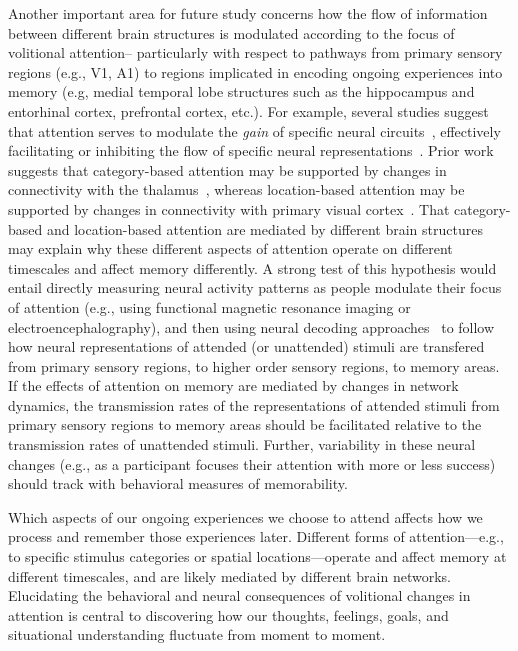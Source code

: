 \documentclass[english]{article}
\begin{document}
Another important area for future study concerns how the flow of information
between different brain structures is modulated according to the focus of
volitional attention-- particularly with respect to pathways from primary
sensory regions (e.g., V1, A1) to regions implicated in encoding ongoing
experiences into memory (e.g, medial temporal lobe structures such as the
hippocampus and entorhinal cortex, prefrontal cortex, etc.). For example,
several studies suggest that attention serves to modulate the \textit{gain} of
specific neural circuits~\citep{TreuTruj99, ChanEtal02, EldaEtal13,
SaliThie00}, effectively facilitating or inhibiting the flow of specific neural
representations~\citep{VartEtal07, LaRoEtal14}. Prior work suggests that
category-based attention may be supported by changes in connectivity with the
thalamus~\citep{Schn11}, whereas location-based attention may be supported by
changes in connectivity with primary visual cortex~\citep{NoudEtal10}. That
category-based and location-based attention are mediated by different brain
structures may explain why these different aspects of attention operate on
different timescales and affect memory differently. A strong test of this
hypothesis would entail directly measuring neural activity patterns as people
modulate their focus of attention (e.g., using functional magnetic resonance
imaging or electroencephalography), and then using neural decoding
approaches~\citep[e.g.,][]{HaxbEtal01, NormEtal06b, MannEtal18, OwenEtal21} to
follow how neural representations of attended (or unattended) stimuli are
transfered from primary sensory regions, to higher order sensory regions, to
memory areas. If the effects of attention on memory are mediated by changes in
network dynamics, the transmission rates of the representations of attended
stimuli from primary sensory regions to memory areas should be facilitated
relative to the transmission rates of unattended stimuli. Further, variability
in these neural changes (e.g., as a participant focuses their attention with
more or less success) should track with behavioral measures of memorability.

Which aspects of our ongoing experiences we choose to attend affects how we
process and remember those experiences later. Different forms of
attention---e.g., to specific stimulus categories or spatial
locations---operate and affect memory at different timescales, and are likely
mediated by different brain networks. Elucidating the behavioral and neural
consequences of volitional changes in attention is central to discovering how
our thoughts, feelings, goals, and situational understanding fluctuate from
moment to moment.
\end{document}
